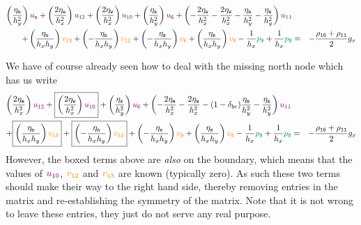 \begin{eqnarray}
\left( \frac{\eta_{\tt n}}{h_y^2} \right) {\color{violet} u_{\tt n}} + 
\left( \frac{2\eta_{\tt e}}{h_x^2} \right) {\color{violet} u_{\tt 12}} + 
\left( \frac{2\eta_{\tt w}}{h_x^2} \right) {\color{violet} u_{\tt 10}} + 
\left( \frac{\eta_{\tt s}}{h_y^2} \right) {\color{violet} u_{\tt 6}} + 
\left( -\frac{2\eta_{\tt e}}{h_x^2} -\frac{2\eta_{\tt w}}{h_x^2}  
-\frac{\eta_{\tt n}}{h_y^2} -\frac{\eta_{\tt s}}{h_y^2}  
\right) {\color{violet} u_{11}} \nonumber\\
+
\left( \frac{\eta_{\tt n}}{h_x h_y} \right) {\color{orange} v_{\tt 13}}+ 
\left(-\frac{\eta_{\tt n}}{h_x h_y} \right) {\color{orange} v_{\tt 12}}+ 
\left(-\frac{\eta_{\tt s}}{h_x h_y} \right) {\color{orange} v_{\tt 9}}+ 
\left( \frac{\eta_{\tt s}}{h_x h_y} \right) {\color{orange} v_{\tt 8}} 
- \frac{1}{h_x} {\color{teal}p_{\tt 9}} + \frac{1}{h_x} {\color{teal}p_{\tt 8}} 
&=& -\frac{\rho_{\tt 16}+\rho_{\tt 11}}{2} g_x \nonumber
\end{eqnarray}

We have of course already seen how to deal with the missing north node which has us write 
\begin{eqnarray}
\left( \frac{2\eta_{\tt e}}{h_x^2} \right) {\color{violet} u_{\tt 12}} + 
\boxed{\left( \frac{2\eta_{\tt w}}{h_x^2} \right) {\color{violet} u_{\tt 10}}} + 
\left( \frac{\eta_{\tt s}}{h_y^2} \right) {\color{violet} u_{\tt 6}} + 
\left( -\frac{2\eta_{\tt e}}{h_x^2} -\frac{2\eta_{\tt w}}{h_x^2}  
-(1-\delta_{bc})\frac{\eta_{\tt n}}{h_y^2} -\frac{\eta_{\tt s}}{h_y^2}  
\right) {\color{violet} u_{11}} \nonumber\\
+
\boxed{\left( \frac{\eta_{\tt n}}{h_x h_y} \right) {\color{orange} v_{\tt 13}}}+ 
\boxed{\left(-\frac{\eta_{\tt n}}{h_x h_y} \right) {\color{orange} v_{\tt 12}}}+ 
\left(-\frac{\eta_{\tt s}}{h_x h_y} \right) {\color{orange} v_{\tt 9}}+ 
\left( \frac{\eta_{\tt s}}{h_x h_y} \right) {\color{orange} v_{\tt 8}} 
- \frac{1}{h_x} {\color{teal}p_{\tt 9}} + \frac{1}{h_x} {\color{teal}p_{\tt 8}} 
&=& -\frac{\rho_{\tt 16}+\rho_{\tt 11}}{2} g_x \nonumber
\end{eqnarray}
However, the boxed terms above are {\it also} on the boundary, which means that the 
values of ${\color{violet} u_{\tt 10}}$, ${\color{orange} v_{\tt 12}}$ and ${\color{orange} v_{\tt 13}}$ are known (typically zero).
As such these two terms should make their way to the right hand side, thereby removing entries in 
the matrix and re-establishing the symmetry of the matrix.
Note that it is not wrong to leave these entries, they just do not serve any real purpose. 


